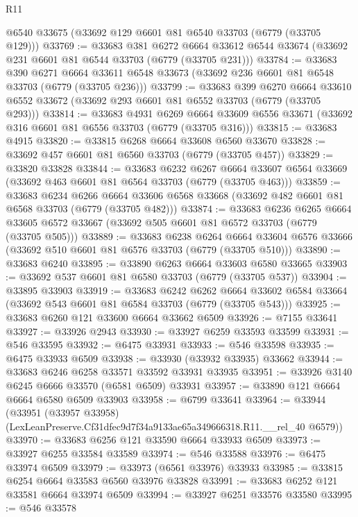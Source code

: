 \begin{lexlean}{R11}
\begin{coremodule}
    @6540
    @33675
    (@33692 @129 @6601 @81 @6540 @33703 (@6779 (@33705 @129)))
@33769 := @33683
    @381
    @6272
    @6664
    @33612
    @6544
    @33674
    (@33692 @231 @6601 @81 @6544 @33703 (@6779 (@33705 @231)))
@33784 := @33683
    @390
    @6271
    @6664
    @33611
    @6548
    @33673
    (@33692 @236 @6601 @81 @6548 @33703 (@6779 (@33705 @236)))
@33799 := @33683
    @399
    @6270
    @6664
    @33610
    @6552
    @33672
    (@33692 @293 @6601 @81 @6552 @33703 (@6779 (@33705 @293)))
@33814 := @33683
    @4931
    @6269
    @6664
    @33609
    @6556
    @33671
    (@33692 @316 @6601 @81 @6556 @33703 (@6779 (@33705 @316)))
@33815 := @33683 @4915
@33820 := @33815 @6268 @6664 @33608 @6560 @33670
@33828 := @33692 @457 @6601 @81 @6560 @33703 (@6779 (@33705 @457))
@33829 := @33820 @33828
@33844 := @33683
    @6232
    @6267
    @6664
    @33607
    @6564
    @33669
    (@33692 @463 @6601 @81 @6564 @33703 (@6779 (@33705 @463)))
@33859 := @33683
    @6234
    @6266
    @6664
    @33606
    @6568
    @33668
    (@33692 @482 @6601 @81 @6568 @33703 (@6779 (@33705 @482)))
@33874 := @33683
    @6236
    @6265
    @6664
    @33605
    @6572
    @33667
    (@33692 @505 @6601 @81 @6572 @33703 (@6779 (@33705 @505)))
@33889 := @33683
    @6238
    @6264
    @6664
    @33604
    @6576
    @33666
    (@33692 @510 @6601 @81 @6576 @33703 (@6779 (@33705 @510)))
@33890 := @33683 @6240
@33895 := @33890 @6263 @6664 @33603 @6580 @33665
@33903 := @33692 @537 @6601 @81 @6580 @33703 (@6779 (@33705 @537))
@33904 := @33895 @33903
@33919 := @33683
    @6242
    @6262
    @6664
    @33602
    @6584
    @33664
    (@33692 @543 @6601 @81 @6584 @33703 (@6779 (@33705 @543)))
@33925 := @33683 @6260 @121 @33600 @6664 @33662 @6509
@33926 := @7155 @33641
@33927 := @33926 @2943
@33930 := @33927 @6259 @33593 @33599
@33931 := @546 @33595
@33932 := @6475 @33931
@33933 := @546 @33598
@33935 := @6475 @33933 @6509
@33938 := @33930 (@33932 @33935) @33662
@33944 := @33683 @6246 @6258 @33571 @33592 @33931 @33935
@33951 := @33926 @3140 @6245 @6666 @33570 (@6581 @6509) @33931
@33957 := @33890 @121 @6664 @6664 @6580 @6509 @33903
@33958 := @6799 @33641
@33964 := @33944
    (@33951 (@33957 @33958) (LexLeanPreserve.Cf31dfec9d7f34a9133ae65a349666318.R11.__rel_40 @6579))
@33970 := @33683 @6256 @121 @33590 @6664 @33933 @6509
@33973 := @33927 @6255 @33584 @33589
@33974 := @546 @33588
@33976 := @6475 @33974 @6509
@33979 := @33973 (@6561 @33976) @33933
@33985 := @33815 @6254 @6664 @33583 @6560 @33976 @33828
@33991 := @33683 @6252 @121 @33581 @6664 @33974 @6509
@33994 := @33927 @6251 @33576 @33580
@33995 := @546 @33578

\end{coremodule}
\end{lexlean}
